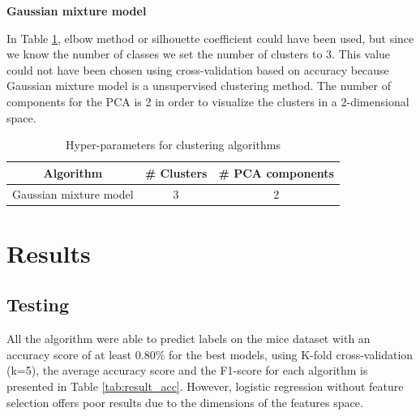 \documentclass[10pt,conference,compsocconf]{IEEEtran}
\begin{document}
\textbf{Gaussian mixture model}

In Table \ref{tab:param_cluster}, elbow method or silhouette coefficient could have been used, but since we know the number of classes we set the number of clusters to 3. This value could not have been chosen using cross-validation based on accuracy because Gaussian mixture model is a unsupervised clustering method. The number of components for the PCA is 2 in order to visualize the clusters in a 2-dimensional space.

\begin{table}[H]
    \centering
    \begin{tabular}{|c|c|c|}
        \hline
        \textbf{Algorithm} &\textbf{\# Clusters} & \textbf{\# PCA components}\\\hline
        Gaussian mixture model& 3 & 2   \\\hline
    \end{tabular}
    \caption{Hyper-parameters for clustering algorithms}
    \label{tab:param_cluster}
\end{table}
\vspace{-1.2cm}


\section{Results}

\subsection{Testing}

All the algorithm were able to predict labels on the mice dataset with an accuracy score of at least 0.80\% for the best models, using K-fold cross-validation (k=5), the average accuracy score and the F1-score for each algorithm is presented in Table \ref{tab:result_acc}. However, logistic regression without feature selection offers poor results due to the dimensions of the features space.
\end{document}
